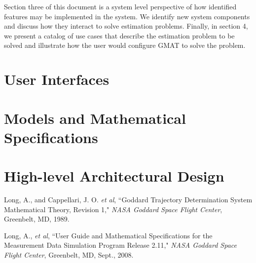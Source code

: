 \documentclass[letterpaper,10pt]{book}
\begin{document}
Section three of this document is a system level perspective of how
identified features may be implemented in the system.  We identify
new system components and discuss how they interact to solve
estimation problems.    Finally, in section 4, we present a catalog
of use cases that describe the estimation problem to be solved and
illustrate how the user would configure GMAT to solve the problem.

\chapter{User Interfaces}
    
    
    
    
    
    
    

\chapter{Models and Mathematical Specifications}
    
    
    
    
    

\chapter{High-level Architectural Design}
    
    
    
    
    
    
    






\begin{thebibliography}{9}%

    Long, A., and Cappellari, J. O. \emph{et al}, ``Goddard Trajectory Determination System
    Mathematical Theory, Revision 1,"  \emph{NASA Goddard Space Flight Center}, Greenbelt, MD, 1989.

     Long, A., \emph{et al}, ``User Guide and Mathematical Specifications for the Measurement Data Simulation Program
    Release 2.11,"  \emph{NASA Goddard Space Flight Center}, Greenbelt, MD, Sept., 2008.

\end{thebibliography}
\end{document}

